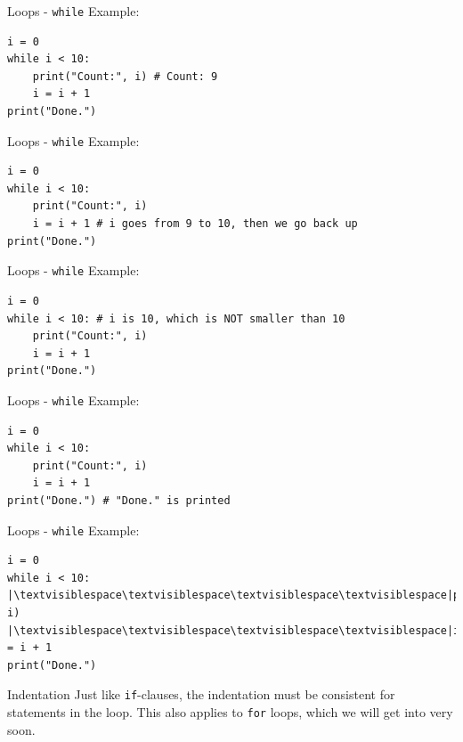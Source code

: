 \documentclass[dvipsnames, svgnames, x11names, handout]{beamer}
\begin{document}
\addtocounter{framenumber}{-1}

\begin{frame}[fragile]{Loops - \texttt{while}}
Example:
\begin{verbatim}
i = 0
while i < 10: 
    print("Count:", i) # Count: 9
    i = i + 1
print("Done.")
\end{verbatim}
\end{frame}

\addtocounter{framenumber}{-1}

\begin{frame}[fragile]{Loops - \texttt{while}}
Example:
\begin{verbatim}
i = 0
while i < 10: 
    print("Count:", i)
    i = i + 1 # i goes from 9 to 10, then we go back up
print("Done.")
\end{verbatim}
\end{frame}

\addtocounter{framenumber}{-1}

\begin{frame}[fragile]{Loops - \texttt{while}}
Example:
\begin{verbatim}
i = 0
while i < 10: # i is 10, which is NOT smaller than 10
    print("Count:", i)
    i = i + 1
print("Done.")
\end{verbatim}
\end{frame}

\addtocounter{framenumber}{-1}

\begin{frame}[fragile]{Loops - \texttt{while}}
Example:
\begin{verbatim}
i = 0
while i < 10:
    print("Count:", i)
    i = i + 1
print("Done.") # "Done." is printed
\end{verbatim}
\end{frame}

\begin{frame}[fragile]{Loops - \texttt{while}}
Example:
\begin{verbatim}
i = 0
while i < 10:
|\textvisiblespace\textvisiblespace\textvisiblespace\textvisiblespace|print("Count:", i)
|\textvisiblespace\textvisiblespace\textvisiblespace\textvisiblespace|i = i + 1
print("Done.")
\end{verbatim}
\begin{block}{Indentation}
Just like \texttt{if}-clauses, the indentation must be consistent for statements in the loop.
This also applies to \texttt{for} loops, which we will get into very soon.
\end{block}
\end{frame}
\end{document}
